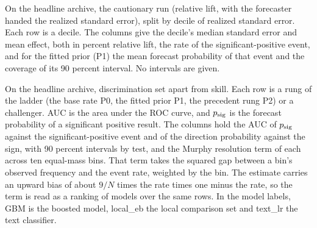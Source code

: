 \begin{table}[tp]\centering\scriptsize
\caption{On the headline archive, the cautionary run (relative lift, with the forecaster handed the realized standard error), split by decile of realized standard error. Each row is a decile. The columns give the decile's median standard error and mean effect, both in percent relative lift, the rate of the significant-positive event, and for the fitted prior (P1) the mean forecast probability of that event and the coverage of its 90 percent interval. No intervals are given.}
\label{tab:cautionary}
\resizebox{\columnwidth}{!}{}
\end{table}

\begin{table}[tp]\centering\scriptsize
\caption{On the headline archive, discrimination set apart from skill. Each row is a rung of the ladder (the base rate P0, the fitted prior P1, the precedent rung P2) or a challenger. AUC is the area under the ROC curve, and $\psig$ is the forecast probability of a significant positive result. The columns hold the AUC of $\psig$ against the significant-positive event and of the direction probability against the sign, with 90 percent intervals by test, and the Murphy resolution term of each across ten equal-mass bins. That term takes the squared gap between a bin's observed frequency and the event rate, weighted by the bin. The estimate carries an upward bias of about $9/N$ times the rate times one minus the rate, so the term is read as a ranking of models over the same rows. In the model labels, GBM is the boosted model, local\_eb the local comparison set and text\_lr the text classifier.}
\label{tab:discrimination}
\resizebox{\columnwidth}{!}{}
\end{table}

